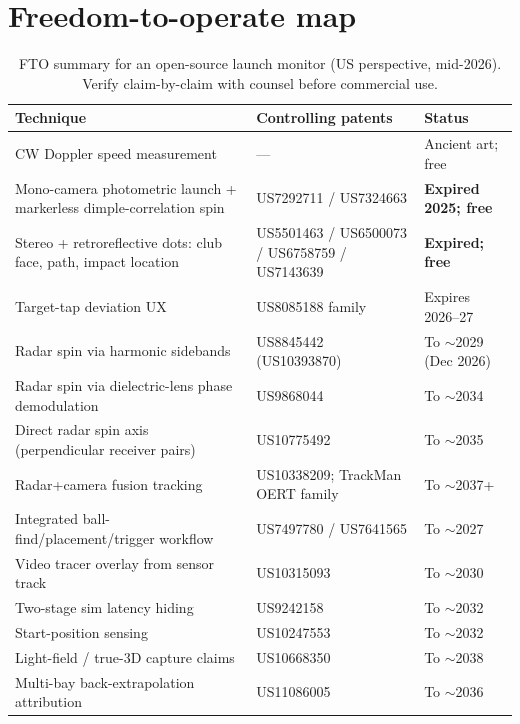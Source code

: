 \section{Freedom-to-operate map}
\label{sec:fto}

\begin{table}[htbp]
\centering\small
\caption{FTO summary for an open-source launch monitor (US perspective,
mid-2026). Verify claim-by-claim with counsel before commercial use.}
\label{tab:fto}
\begin{tabular}{@{}p{7.6cm}p{3.4cm}p{3.2cm}@{}}
\toprule
\textbf{Technique} & \textbf{Controlling patents} & \textbf{Status} \\
\midrule
CW Doppler speed measurement & --- & Ancient art; free \\
Mono-camera photometric launch + markerless dimple-correlation spin &
  US7292711 / US7324663 & \textbf{Expired 2025; free} \\
Stereo + retroreflective dots: club face, path, impact location &
  US5501463 / US6500073 / US6758759 / US7143639 & \textbf{Expired; free} \\
Target-tap deviation UX & US8085188 family & Expires 2026--27 \\
Radar spin via harmonic sidebands & US8845442 (US10393870) &
  To $\sim$2029 (Dec 2026) \\
Radar spin via dielectric-lens phase demodulation & US9868044 &
  To $\sim$2034 \\
Direct radar spin axis (perpendicular receiver pairs) & US10775492 &
  To $\sim$2035 \\
Radar+camera fusion tracking & US10338209; TrackMan OERT family &
  To $\sim$2037+ \\
Integrated ball-find/placement/trigger workflow & US7497780 / US7641565 &
  To $\sim$2027 \\
Video tracer overlay from sensor track & US10315093 & To $\sim$2030 \\
Two-stage sim latency hiding & US9242158 & To $\sim$2032 \\
Start-position sensing & US10247553 & To $\sim$2032 \\
Light-field / true-3D capture claims & US10668350 & To $\sim$2038 \\
Multi-bay back-extrapolation attribution & US11086005 & To $\sim$2036 \\
\bottomrule
\end{tabular}
\end{table}

